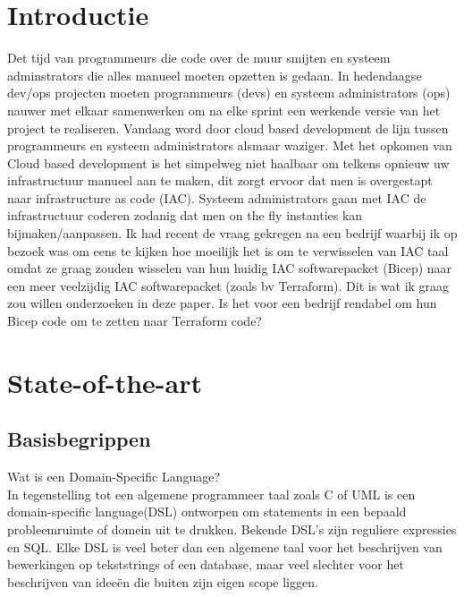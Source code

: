 
\section{Introductie}%
\label{sec:introductie}
Det tijd van programmeurs die code over de muur smijten en systeem adminstrators die alles manueel moeten opzetten is gedaan.
In hedendaagse dev/ops projecten moeten programmeurs (devs) en systeem administrators (ops) nauwer met elkaar samenwerken om na elke sprint een werkende versie van het project te realiseren.
Vandaag word door cloud based development de lijn tussen programmeurs en systeem administrators alsmaar waziger. 
Met het opkomen van Cloud based development is het simpelweg niet haalbaar om telkens opnieuw uw infrastructuur manueel aan te maken, dit zorgt ervoor dat men is overgestapt naar infrastructure as code (IAC).
Systeem administrators gaan met IAC de infrastructuur coderen zodanig dat men on the fly instanties kan bijmaken/aanpassen.
Ik had recent de vraag gekregen na een bedrijf waarbij ik op bezoek was om eens te kijken hoe moeilijk het is om te verwisselen van IAC taal
omdat ze graag zouden wisselen van hun huidig IAC softwarepacket (Bicep) naar een meer veelzijdig IAC softwarepacket (zoals bv Terraform).  
Dit is wat ik graag zou willen onderzoeken in deze paper.
Is het voor een bedrijf rendabel om hun Bicep code om te zetten naar Terraform code?




\section{State-of-the-art}%
\label{sec:state-of-the-art}
\subsection{Basisbegrippen}%

Wat is een Domain-Specific Language?
\\
In tegenstelling tot een algemene programmeer taal zoals C of UML is een domain-specific language(DSL)
ontworpen om statements in een bepaald probleemruimte of domein uit te drukken.
Bekende DSL's zijn reguliere expressies en SQL. Elke DSL is veel beter dan een algemene taal voor het beschrijven van bewerkingen op tekststrings of een database, 
maar veel slechter voor het beschrijven van ideeën die buiten zijn eigen scope liggen.
\autocite{DSL2022}

